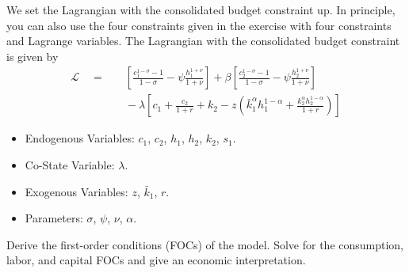 \documentclass[a4paper, 12pt]{article}
\begin{document}
\begin{Answer}%
	We set the Lagrangian with the consolidated budget constraint up. In principle, you can also use the four constraints given in the exercise with four constraints and Lagrange variables. The Lagrangian with the consolidated budget constraint is given by
	\begin{align*}
		\mathcal{L} \quad = & \quad \left[\frac{c_1^{1-\sigma}-1}{1-\sigma}-\psi\frac{h_1^{1+\nu}}{1+\nu}\right] + \beta \left[\frac{c_2^{1-\sigma}-1}{1-\sigma}-\psi\frac{h_2^{1+\nu}}{1+\nu}\right]\\
		& \quad - \lambda \left[ c_1 + \frac{c_2}{1+r} + k_2 - z \left(\bar{k}_1^\alpha h_1^{1-\alpha} + \frac{k_2^\alpha h_2^{1-\alpha}}{1+r} \right) \right]
	\end{align*}
	\begin{itemize}
		\item Endogenous Variables: $c_1$, $c_2$, $h_1$, $h_2$, $k_2$, $s_1$.
		\item Co-State Variable: $\lambda$.
		\item Exogenous Variables: $z$, $\bar{k}_1$, $r$.
		\item Parameters: $\sigma$, $\psi$, $\nu$, $\alpha$.
	\end{itemize}
\end{Answer}%
\begin{Exercise}%
	Derive the first-order conditions (FOCs) of the model. Solve for the consumption, labor, and capital FOCs and give an economic interpretation.
\end{Exercise}%
\end{document}

